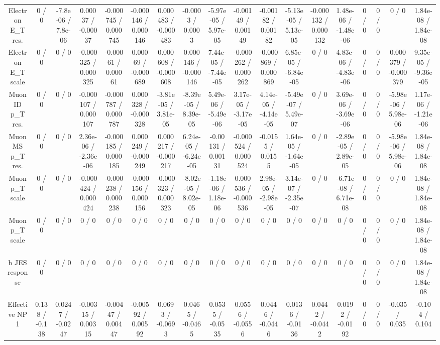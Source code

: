 \documentclass[10pt]{article}
\begin{document}
\begin{table}[htbp]
\begin{center}
\begin{tabular}{|c|c|c|c|c|c|c|c|c|c|c|c|c|c|c|c|c|c|}
  Electron E_{T} res. & 0 / 0 & -7.8e-06 / 7.8e-06 & 0.00037 / -0.00037 & -0.000745 / 0.000745 & -0.000146 / 0.000146 & 0.000483 / -0.000483 & -0.0003 / 0.0003 & -5.97e-05 / 5.97e-05 & -0.00149 / 0.00149 & -0.00182 / 0.00182 & -5.13e-05 / 5.13e-05 & -0.000132 / 0.000132 & 1.48e-06 / -1.48e-06 & 0 / 0 & 0 / 0 & 0 / 0 & 1.84e-08 / 1.84e-08 \\ 
  Electron E_{T} scale & 0 / 0 & 0 / 0 & -0.000325 / 0.000325 & -0.00061 / 0.00061 & 0.00069 / -0.000689 & 0.000608 / -0.000608 & 0.000146 / -0.000146 & 7.44e-05 / -7.44e-05 & -0.000262 / 0.000262 & -0.000869 / 0.000869 & 6.85e-05 / -6.84e-05 & 0 / 0 & 4.83e-06 / -4.83e-06 & 0 / 0 & 0 / 0 & 0.000379 / -0.000379 & 9.35e-05 / -9.36e-05 \\ 
  Muon ID p_{T} res. & 0 / 0 & 0 / 0 & -0.000107 / 0.000107 & -0.000787 / 0.000787 & 0.000328 / -0.000328 & -3.81e-05 / 3.81e-05 & -8.39e-05 / 8.39e-05 & 5.49e-06 / -5.49e-06 & 3.17e-05 / -3.17e-05 & 4.14e-05 / -4.14e-05 & -5.49e-07 / 5.49e-07 & 0 / 0 & 3.69e-06 / -3.69e-06 & 0 / 0 & 0 / 0 & -5.98e-06 / 5.98e-06 & 1.17e-06 / -1.21e-06 \\ 
  Muon MS p_{T} res. & 0 / 0 & 0 / 0 & 2.36e-06 / -2.36e-06 & -0.000185 / 0.000185 & 0.000249 / -0.000249 & 0.000217 / -0.000217 & 6.24e-05 / -6.24e-05 & -0.00131 / 0.00131 & -0.000524 / 0.000524 & -0.0155 / 0.0155 & 1.64e-05 / -1.64e-05 & 0 / 0 & -2.89e-05 / 2.89e-05 & 0 / 0 & 0 / 0 & -5.98e-06 / 5.98e-06 & 1.84e-08 / 1.84e-08 \\ 
  Muon p_{T} scale & 0 / 0 & 0 / 0 & -0.000424 / 0.000424 & -0.000238 / 0.000238 & -0.000156 / 0.000156 & -0.000323 / 0.000323 & -8.02e-05 / 8.02e-05 & -1.18e-06 / 1.18e-06 & 0.000536 / -0.000536 & 2.98e-05 / -2.98e-05 & 3.14e-07 / -2.35e-07 & 0 / 0 & -6.71e-08 / 6.71e-08 & 0 / 0 & 0 / 0 & 0 / 0 & 1.84e-08 / 1.84e-08 \\ 
  Muon p_{T} scale & 0 / 0 & 0 / 0 & 0 / 0 & 0 / 0 & 0 / 0 & 0 / 0 & 0 / 0 & 0 / 0 & 0 / 0 & 0 / 0 & 0 / 0 & 0 / 0 & 0 / 0 & 0 / 0 & 0 / 0 & 0 / 0 & 1.84e-08 / 1.84e-08 \\ 
  b JES response & 0 / 0 & 0 / 0 & 0 / 0 & 0 / 0 & 0 / 0 & 0 / 0 & 0 / 0 & 0 / 0 & 0 / 0 & 0 / 0 & 0 / 0 & 0 / 0 & 0 / 0 & 0 / 0 & 0 / 0 & 0 / 0 & 1.84e-08 / 1.84e-08 \\ 
  Effective NP 1 & 0.138 / -0.138 & 0.0247 / -0.0247 & -0.00315 / 0.00315 & -0.00447 / 0.00447 & -0.00592 / 0.00592 & 0.0693 / -0.0693 & 0.0465 / -0.0465 & 0.0535 / -0.0535 & 0.0556 / -0.0556 & 0.0446 / -0.0446 & 0.0136 / -0.0136 & 0.0442 / -0.0442 & 0.0192 / -0.0192 & 0 / 0 & 0 / 0 & -0.035 / 0.035 & -0.104 / 0.104 \\ 

\end{tabular}
\end{center}
\end{table}
\end{document}
